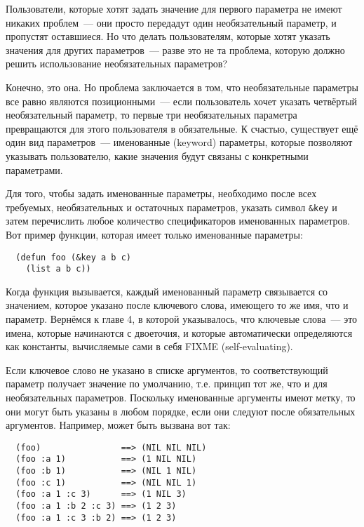 Пользователи, которые хотят задать значение для первого параметра не имеют никаких
проблем~--- они просто передадут один необязательный параметр, и пропустят оставшиеся.  Но
что делать пользователям, которые хотят указать значения для других параметров~--- разве
это не та проблема, которую должно решить использование необязательных параметров?

Конечно, это она.  Но проблема заключается в том, что необязательные параметры все равно
являются позиционными~--- если пользователь хочет указать четвёртый необязательный
параметр, то первые три необязательных параметра превращаются для этого пользователя в
обязательные.  К счастью, существует ещё один вид параметров~--- именованные (keyword)
параметры, которые позволяют указывать пользователю, какие значения будут связаны с
конкретными параметрами.

Для того, чтобы задать именованные параметры, необходимо после всех требуемых,
необязательных и остаточных параметров, указать символ \lstinline!&key! и затем
перечислить любое количество спецификаторов именованных параметров.  Вот пример функции,
которая имеет только именованные параметры:

\begin{lstlisting}
  (defun foo (&key a b c) 
    (list a b c))
\end{lstlisting}

Когда функция вызывается, каждый именованный параметр связывается со значением, которое
указано после ключевого слова, имеющего то же имя, что и параметр.  Вернёмся к главе 4, в
которой указывалось, что ключевые слова~--- это имена, которые начинаются с двоеточия, и
которые автоматически определяются как константы, вычисляемые сами в себя FIXME
(self-evaluating).

Если ключевое слово не указано в списке аргументов, то соответствующий параметр получает
значение по умолчанию, т.е. принцип тот же, что и для необязательных параметров.
Поскольку именованные аргументы имеют метку, то они могут быть указаны в любом порядке,
если они следуют после обязательных аргументов.  Например,  может быть вызвана
вот так:

\begin{verbatim}
  (foo)                ==> (NIL NIL NIL)
  (foo :a 1)           ==> (1 NIL NIL)
  (foo :b 1)           ==> (NIL 1 NIL)
  (foo :c 1)           ==> (NIL NIL 1)
  (foo :a 1 :c 3)      ==> (1 NIL 3)
  (foo :a 1 :b 2 :c 3) ==> (1 2 3)
  (foo :a 1 :c 3 :b 2) ==> (1 2 3)
\end{verbatim}

